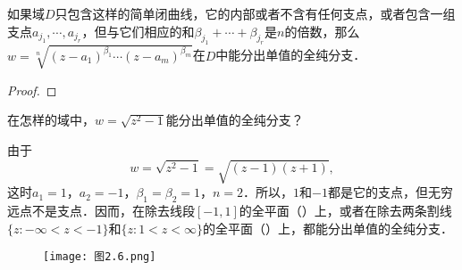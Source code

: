 \documentclass[../../main.tex]{subfiles}
\begin{document}
\begin{theorem}\label{theorem:多值函数分出单值全纯分支}
如果域$D$只包含这样的简单闭曲线，它的内部或者不含有任何支点，或者包含一组支点$a_{j_1}, \cdots, a_{j_r}$，但与它们相应的和$\beta_{j_1} + \cdots + \beta_{j_r}$是$n$的倍数，那么$w = \sqrt[n]{(z - a_1)^{\beta_1} \cdots (z - a_m)^{\beta_m}}$在$D$中能分出单值的全纯分支．
\end{theorem}
\begin{proof}

\end{proof}

\begin{example}
在怎样的域中，$w = \sqrt{z^2 - 1}$能分出单值的全纯分支？
\end{example}
\begin{solution}
由于
\[
w = \sqrt{z^2 - 1} = \sqrt{(z - 1)(z + 1)},
\]
这时$a_1 = 1$，$a_2 = -1$，$\beta_1 = \beta_2 = 1$，$n = 2$．所以，$1$和$-1$都是它的支点，但无穷远点不是支点．因而，在除去线段$[-1,1]$的全平面（）上，或者在除去两条割线$\{ z: -\infty < z < -1 \}$和$\{ z: 1 < z < \infty \}$的全平面（）上，都能分出单值的全纯分支．

\begin{figure}[H]
\centering
\texttt{[image: 图2.6.png]}
\caption{}
\label{figure:图2.6}
\end{figure}

\end{solution}
\end{document}

